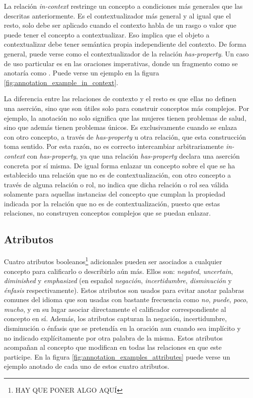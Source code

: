 La relación \textit{in-context} restringe un concepto a condiciones más generales que las descritas anteriormente. Es el contextualizador más general y al igual que el resto, solo debe ser aplicado cuando el contexto habla de un rasgo o valor que puede tener el concepto a contextualizar. Eso implica que el objeto a contextualizar debe tener semántica propia independiente del contexto. De forma general, puede verse como el contextualizador de la relación \textit{has-property}. Un caso de uso particular es en las oraciones imperativas, donde un fragmento como  se anotaría como . Puede verse un ejemplo en la figura \ref{fig:annotation_example_in_context}.

La diferencia entre las relaciones de contexto y el resto es que ellas no definen una aserción, sino que son útiles solo para construir conceptos más complejos. Por ejemplo, la anotación  no solo significa que las mujeres tienen problemas de salud, sino que además tienen problemas únicos. Es exclusivamente cuando se enlaza con otro concepto, a través de \textit{has-property} u otra relación, que esta construcción toma sentido. Por esta razón, no es correcto intercambiar arbitrariamente \textit{in-context} con \textit{has-property}, ya que una relación \textit{has-property} declara una aserción concreta por sí misma. De igual forma enlazar un concepto sobre el que se ha establecido una relación que no es de contextualización, con otro concepto a través de alguna relación o rol, no indica que dicha relación o rol sea válida solamente para aquellas instancias del concepto que cumplan la propiedad indicada por la relación que no es de contextualización, puesto que estas relaciones, no construyen conceptos complejos que se puedan enlazar.

\subsection{Atributos}
Cuatro atributos booleanos\footnote{HAY QUE PONER ALGO AQUÍ} adicionales pueden ser asociados a cualquier concepto para calificarlo o describirlo aún más. Ellos son: \textit{negated}, \textit{uncertain}, \textit{diminished} y \textit{emphasized} (en español \textit{negación}, \textit{incertidumbre}, \textit{disminución} y \textit{énfasis} respectivamente). Estos atributos son usados para evitar anotar palabras comunes del idioma que son usadas con bastante frecuencia como \textit{no}, \textit{puede}, \textit{poco}, \textit{mucho}, y en su lugar asociar directamente el calificador correspondiente al concepto en sí. Además, los atributos capturan la negación, incertidumbre, disminución o énfasis que se pretendía en la oración aun cuando sea implícito y no indicado explícitamente por otra palabra de la misma. Estos atributos acompañan al concepto que modifican en todas las relaciones en que este participe. En la figura \ref{fig:annotation_examples_attributes} puede verse un ejemplo anotado de cada uno de estos cuatro atributos.

